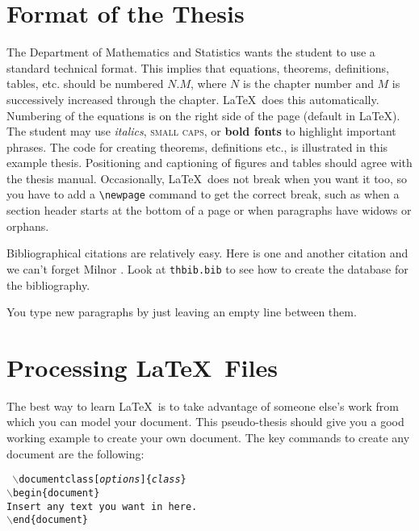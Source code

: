\section{Format of the Thesis}
The Department of Mathematics and Statistics wants the student to use
a standard technical format. This implies that equations, theorems,
definitions, tables, etc. should be numbered $N.M$, where $N$ is the
chapter number and $M$ is successively increased through the chapter.
\LaTeX\ does this automatically. Numbering of the equations is on the
right side of the page (default in \LaTeX).  The student may use
\textit{italics}, \textsc{small caps}, or \textbf{bold fonts} to
highlight important phrases.  The code for creating theorems,
definitions etc., is illustrated in this example thesis.  Positioning
and captioning of figures and tables should agree with the thesis
manual.  Occasionally, \LaTeX\ does not break when you want it too, so
you have to add a \verb+\newpage+ command to get the correct break,
such as when a section header starts at the bottom of a page or when
paragraphs have widows or orphans.

Bibliographical citations are relatively easy.  Here is one \cite{ART}
and another citation \cite{Lehto:1976} and we can't forget Milnor
\cite{Milnor:topdiff}.  Look at \verb+thbib.bib+ to see how to create
the database for the bibliography.

You type new paragraphs by just leaving an empty line between them.



\section{Processing \LaTeX\ Files}

The best way to learn \LaTeX\ is to take advantage of someone else's
work from which you can model your document. This pseudo-thesis should
give you a good working example to create your own document. The key
commands to create any document are the following: \vspace{.15in}

\noindent\texttt{%
  \ssp %
  \hspace*{5em}$\backslash$documentclass[\emph{options}]\{\emph{class}\}\\
  \hspace*{5em}$\backslash$begin\{document\}\\
  \hspace*{7em}Insert any text you want in here.\\
  \hspace*{5em}$\backslash$end\{document\}\\
}

